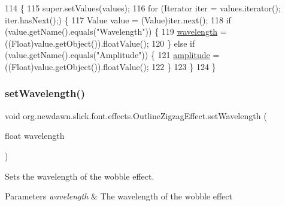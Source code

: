 \begin{DoxyCode}
114                                        \{
115         super.setValues(values);
116         \textcolor{keywordflow}{for} (Iterator iter = values.iterator(); iter.hasNext();) \{
117             Value value = (Value)iter.next();
118             \textcolor{keywordflow}{if} (value.getName().equals(\textcolor{stringliteral}{"Wavelength"})) \{
119                 \mbox{\hyperlink{classorg_1_1newdawn_1_1slick_1_1font_1_1effects_1_1_outline_zigzag_effect_a4393ec4437b469ea2855c70deec82d09}{wavelength}} = ((Float)value.getObject()).floatValue();
120             \} \textcolor{keywordflow}{else} \textcolor{keywordflow}{if} (value.getName().equals(\textcolor{stringliteral}{"Amplitude"})) \{
121                 \mbox{\hyperlink{classorg_1_1newdawn_1_1slick_1_1font_1_1effects_1_1_outline_zigzag_effect_a26543e6243bf5e4fb7486d7a7674ed1c}{amplitude}} = ((Float)value.getObject()).floatValue();
122             \}
123         \}
124     \}
\end{DoxyCode}
\mbox{\label{classorg_1_1newdawn_1_1slick_1_1font_1_1effects_1_1_outline_zigzag_effect_a4cb75825f9ef0966efc582099f406457}} 
\subsubsection{\texorpdfstring{set\+Wavelength()}{setWavelength()}}
{\footnotesize\ttfamily void org.\+newdawn.\+slick.\+font.\+effects.\+Outline\+Zigzag\+Effect.\+set\+Wavelength (\begin{DoxyParamCaption}\item[{float}]{wavelength }\end{DoxyParamCaption})\hspace{0.3cm}{\ttfamily [inline]}}

Sets the wavelength of the wobble effect.


\begin{DoxyParams}{Parameters}
{\em wavelength} & The wavelength of the wobble effect \\
\hline
\end{DoxyParams}

